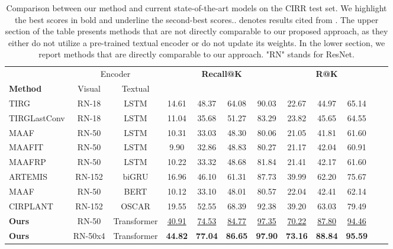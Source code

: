 \documentclass[acmlarge]{acmart}
\begin{document}
\begin{table}[t]
\centering
\begin{tabular}{lcccc  cccc ccc}
  \toprule
& \multicolumn{2}{c}{Encoder} &\multicolumn{4}{c}{\textbf{Recall@K}} & \multicolumn{3}{c}{\textbf{R@K}} \\
\cmidrule(lr){2-3}
\cmidrule(lr){4-7}
\cmidrule(lr){8-10}
\textbf{Method} & Visual & Textual &  &  &   &  &   &  &   \\
\midrule
TIRG \cite{vo2019composing} & RN-18 & LSTM & 14.61 & 48.37 & 64.08 & 90.03 & 22.67 & 44.97 & 65.14   \\
TIRGLastConv \cite{vo2019composing} & RN-18 & LSTM & 11.04 & 35.68 & 51.27 & 83.29 & 23.82 & 45.65 & 64.55   \\ 
MAAF \cite{dodds2020modality} & RN-50 & LSTM & 10.31 & 33.03 & 48.30 & 80.06 & 21.05 & 41.81 & 61.60 \\ 
MAAFIT \cite{dodds2020modality} & RN-50 & LSTM & 9.90 & 32.86 & 48.83 & 80.27 & 21.17 & 42.04 & 60.91 \\ 
MAAFRP \cite{dodds2020modality} & RN-50 & LSTM & 10.22 & 33.32 & 48.68 & 81.84 & 21.41 & 42.17 & 61.60 \\ 
ARTEMIS \cite{delmas2021artemis} & RN-152 & biGRU & 16.96 & 46.10 & 61.31 & 87.73 & 39.99 & 62.20 & 75.67 \\ \midrule[.02em]
MAAF \cite{dodds2020modality} & RN-50 & BERT & 10.12 & 33.10 & 48.01 & 80.57 & 22.04 & 42.41 & 62.14 \\
CIRPLANT \cite{liu2021image} & RN-152 & OSCAR & 19.55 & 52.55 & 68.39 & 92.38 & 39.20 & 63.03 & 79.49 \\
\rowcolor{LightCyan}
\textbf{Ours} & RN-50 & Transformer & \underline{40.91} & \underline{74.53} & \underline{84.77} & \underline{97.35} & \underline{70.22} & \underline{87.80} & \underline{94.46} \\ 
\rowcolor{LightCyan}
\textbf{Ours} & RN-50x4 & Transformer & \textbf{44.82} & \textbf{77.04} & \textbf{86.65} & \textbf{97.90} & \textbf{73.16} & \textbf{88.84} & \textbf{95.59}\\ \bottomrule
\end{tabular}
\caption{Comparison between our method and current state-of-the-art models on the CIRR test set. We highlight the best scores in bold and underline the second-best scores..  denotes results cited from \cite{liu2021image}. The upper section of the table presents methods that are not directly comparable to our proposed approach, as they either do not utilize a pre-trained textual encoder or do not update its weights. In the lower section, we report methods that are directly comparable to our approach. "RN" stands for ResNet.}
\label{tab:cirr-comparison}
\vspace{-4ex}
\end{table}
\end{document}
